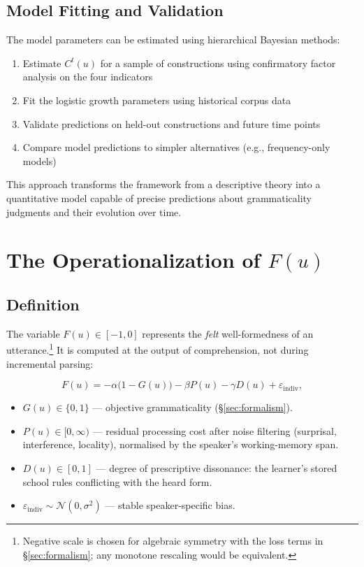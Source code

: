 \documentclass[12pt,letterpaper]{article}
\begin{document}
\subsection{Model Fitting and Validation}

The model parameters can be estimated using hierarchical Bayesian methods:

\begin{enumerate}
    \item Estimate $C^t(u)$ for a sample of constructions using confirmatory factor analysis on the four indicators
    \item Fit the logistic growth parameters using historical corpus data
    \item Validate predictions on held-out constructions and future time points
    \item Compare model predictions to simpler alternatives (e.g., frequency-only models)
\end{enumerate}

This approach transforms the framework from a descriptive theory into a quantitative model capable of precise predictions about grammaticality judgments and their evolution over time.


\section{The Operationalization of \texorpdfstring{$F(u)$}{F(u)}}
\label{sec:Fu}

\subsection{Definition}
The variable $F(u)\in[-1,0]$ represents the \textit{felt} well-formedness of an
utterance.\footnote{Negative scale is chosen for algebraic symmetry with the
loss terms in §\ref{sec:formalism}; any monotone rescaling would be equivalent.}
It is computed at the output of comprehension, not during
incremental parsing:

\[
F(u)=
 -\alpha\bigl(1-G(u)\bigr)
 -\beta P(u)
 -\gamma D(u)
 +\varepsilon_{\!\text{indiv}} ,
\]

\begin{itemize}
  \item $G(u)\in\{0,1\}$ — objective grammaticality (§\ref{sec:formalism}).
  \item $P(u)\in[0,\infty)$ — residual processing cost after noise filtering
        (surprisal, interference, locality), normalised by the speaker’s
        working-memory span.
  \item $D(u)\in[0,1]$ — degree of prescriptive dissonance: the learner’s
        stored school rules conflicting with the heard form.
  \item $\varepsilon_{\!\text{indiv}}\sim\mathcal N(0,\sigma^2)$ — stable
        speaker-specific bias.
\end{itemize}
\end{document}

